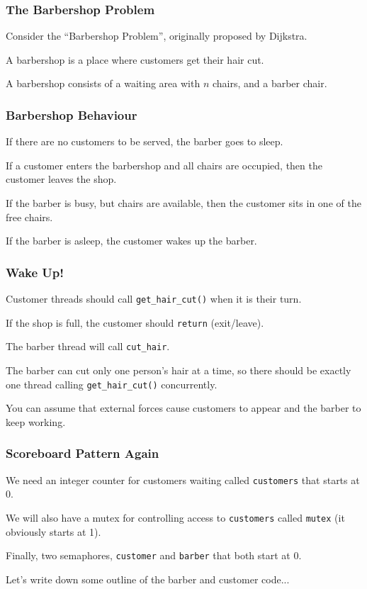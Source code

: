 \begin{frame}
	\frametitle{The Barbershop Problem}

	Consider the ``Barbershop Problem'', originally proposed by Dijkstra.

	A barbershop is a place where customers get their hair cut.

	A barbershop consists of a waiting area with $n$ chairs, and a barber chair.

\end{frame}


\begin{frame}
	\frametitle{Barbershop Behaviour}

	If there are no customers to be served, the barber goes to sleep.

	If a customer enters the barbershop and all chairs are occupied, then the customer leaves the shop.

	If the barber is busy, but chairs are available, then the customer sits in one of the free chairs.

	If the barber is asleep, the customer wakes up the barber.

\end{frame}

\begin{frame}
	\frametitle{Wake Up!}

	Customer threads should call \texttt{get\_hair\_cut()} when it is their turn.

	If the shop is full, the customer should \texttt{return} (exit/leave).

	The barber thread will call \texttt{cut\_hair}.

	The barber can cut only one person's hair at a time, so there should be exactly one thread calling \texttt{get\_hair\_cut()} concurrently.

	You can assume that external forces cause customers to appear and the barber to keep working.

\end{frame}


\begin{frame}
	\frametitle{Scoreboard Pattern Again}


	We need an integer counter for customers waiting called \texttt{customers} that starts at 0.

	We will also have a mutex for controlling access to \texttt{customers} called \texttt{mutex} (it obviously starts at 1).

	Finally, two semaphores, \texttt{customer} and \texttt{barber} that both start at 0.

	Let's write down some outline of the barber and customer code...

\end{frame}


